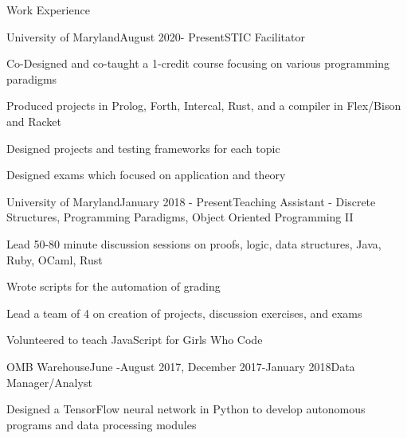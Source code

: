 \documentclass{resume} %
\begin{document}
\begin{rSection}{Work Experience}

\begin{rSubsection}{University of Maryland}{August 2020- Present}{STIC Facilitator}{}
\item Co-Designed and co-taught a 1-credit course focusing on various programming paradigms
\item Produced projects in Prolog, Forth, Intercal, Rust, and a compiler in Flex/Bison and Racket
\item Designed projects and testing frameworks for each topic
\item Designed exams which focused on application and theory
\end{rSubsection}

\begin{rSubsection}{University of Maryland}{January 2018 - Present}{Teaching Assistant - Discrete Structures, Programming Paradigms, Object Oriented Programming II}{}
\item Lead 50-80 minute discussion sessions on proofs, logic, data structures, Java, Ruby, OCaml, Rust
\item Wrote scripts for the automation of grading
\item Lead a team of 4 on creation of projects, discussion exercises, and exams 
\item Volunteered to teach JavaScript for Girls Who Code
\end{rSubsection}


\begin{rSubsection}{OMB Warehouse}{June -August 2017, December 2017-January 2018}{Data Manager/Analyst}{}
\item Designed a TensorFlow neural network in Python to develop autonomous programs and data processing modules
\end{rSubsection}

\end{rSection}

\end{document}
